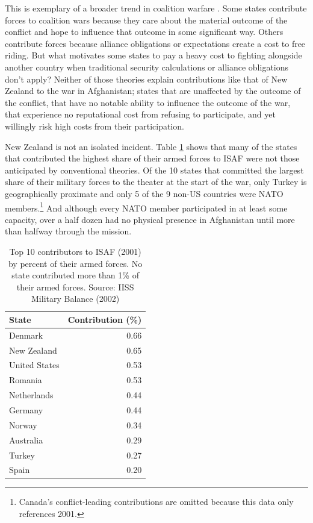 \documentclass[12pt,letterpaper]{article}
\begin{document}
	This is exemplary of a broader trend in coalition warfare \citep{vonhlatky_greatasymmetryamerica_2010}. Some states contribute forces to coalition wars because they care about the material outcome of the conflict and hope to influence that outcome in some significant way. Others contribute forces because alliance obligations or expectations create a cost to free riding. But what motivates some states to pay a heavy cost to fighting alongside another country when traditional security calculations or alliance obligations don't apply? Neither of those theories explain contributions like that of New Zealand to the war in Afghanistan; states that are unaffected by the outcome of the conflict, that have no notable ability to influence the outcome of the war, that experience no reputational cost from refusing to participate, and yet willingly risk high costs from their participation.
	
	New Zealand is not an isolated incident. Table \ref{table:2001_top} shows that many of the states that contributed the highest share of their armed forces to ISAF were not those anticipated by conventional theories. Of the 10 states that committed the largest share of their military forces to the theater at the start of the war, only Turkey is geographically proximate and only 5 of the 9 non-US countries were NATO members.\footnote{Canada's conflict-leading contributions are omitted because this data only references 2001.} And although every NATO member participated in at least some capacity, over a half dozen had no physical presence in Afghanistan until more than halfway through the mission.

	\begin{table}[ht]
		\centering
		\begin{tabular}{|lr|}
			\hline
			\textbf{State} & \textbf{Contribution (\%)} \\
			\hline
			Denmark & 0.66 \\
			New Zealand & 0.65 \\
			United States & 0.53 \\
			Romania & 0.53 \\
			Netherlands & 0.44 \\
			Germany & 0.44 \\
			Norway & 0.34 \\
			Australia & 0.29 \\
			Turkey & 0.27 \\
			Spain & 0.20 \\
			\hline
		\end{tabular}
	\caption{Top 10 contributors to ISAF (2001) by percent of their armed forces. No state contributed more than 1\% of their armed forces. Source: IISS Military Balance (2002)}
	\label{table:2001_top}
	\end{table}
\end{document}
